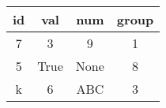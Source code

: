 \documentclass{article}
\begin{document}
\begin{tabular}{|c|c|c|c|}
\hline
id & val & num & group\\
\hline
7 & 3 & 9 & 1\\
\hline
5 & True & None & 8\\
\hline
k & 6 & ABC & 3\\
\hline
\end{tabular}
\end{document}
